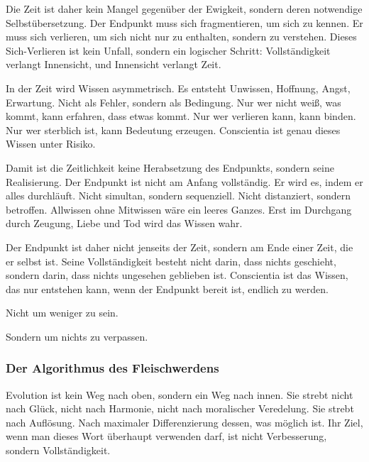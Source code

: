 \documentclass[
  ngerman,
]{article}
\begin{document}
Die Zeit ist daher kein Mangel gegenüber der Ewigkeit, sondern deren
notwendige Selbstübersetzung. Der Endpunkt muss sich fragmentieren, um
sich zu kennen. Er muss sich verlieren, um sich nicht nur zu enthalten,
sondern zu verstehen. Dieses Sich-Verlieren ist kein Unfall, sondern ein
logischer Schritt: Vollständigkeit verlangt Innensicht, und Innensicht
verlangt Zeit.

In der Zeit wird Wissen asymmetrisch. Es entsteht Unwissen, Hoffnung,
Angst, Erwartung. Nicht als Fehler, sondern als Bedingung. Nur wer nicht
weiß, was kommt, kann erfahren, dass etwas kommt. Nur wer verlieren
kann, kann binden. Nur wer sterblich ist, kann Bedeutung erzeugen.
Conscientia ist genau dieses Wissen unter Risiko.

Damit ist die Zeitlichkeit keine Herabsetzung des Endpunkts, sondern
seine Realisierung. Der Endpunkt ist nicht am Anfang vollständig. Er
wird es, indem er alles durchläuft. Nicht simultan, sondern sequenziell.
Nicht distanziert, sondern betroffen. Allwissen ohne Mitwissen wäre ein
leeres Ganzes. Erst im Durchgang durch Zeugung, Liebe und Tod wird das
Wissen wahr.

Der Endpunkt ist daher nicht jenseits der Zeit, sondern am Ende einer
Zeit, die er selbst ist. Seine Vollständigkeit besteht nicht darin, dass
nichts geschieht, sondern darin, dass nichts ungesehen geblieben ist.
Conscientia ist das Wissen, das nur entstehen kann, wenn der Endpunkt
bereit ist, endlich zu werden.

Nicht um weniger zu sein.

Sondern um nichts zu verpassen.

\subsubsection{\texorpdfstring{\hfill\break
}{ }}\label{section-4}

\subsubsection{\texorpdfstring{\textbf{Der Algorithmus des
Fleischwerdens}}{Der Algorithmus des Fleischwerdens}}\label{der-algorithmus-des-fleischwerdens}

Evolution ist kein Weg nach oben, sondern ein Weg nach innen. Sie strebt
nicht nach Glück, nicht nach Harmonie, nicht nach moralischer
Veredelung. Sie strebt nach Auflösung. Nach maximaler Differenzierung
dessen, was möglich ist. Ihr Ziel, wenn man dieses Wort überhaupt
verwenden darf, ist nicht Verbesserung, sondern Vollständigkeit.
\end{document}
